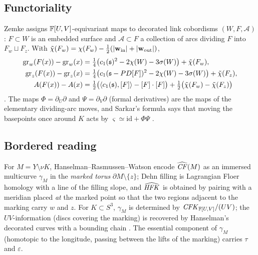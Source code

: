 \subsection{Functoriality}
Zemke \cite{Zemke-link} assigns $\mathbb{F}[U,V]$-equivariant maps to decorated link cobordisms $(W,F,\mathcal A)$:
$F\subset W$ is an embedded surface and $\mathcal A\subset F$ a collection of arcs dividing $F$ into
$F_w\sqcup F_z$.  With $\tilde\chi(F_w)=\chi(F_w)-\frac12(|\mathbf w_{\rm in}|+|\mathbf w_{\rm out}|)$,
\begin{align*}
\mathrm{gr}_w(F(x))-\mathrm{gr}_w(x)&=\tfrac14\big(c_1(\mathfrak s)^2-2\chi(W)-3\sigma(W)\big)+\tilde\chi(F_w),\\
\mathrm{gr}_z(F(x))-\mathrm{gr}_z(x)&=\tfrac14\big(c_1(\mathfrak s-PD[F])^2-2\chi(W)-3\sigma(W)\big)+\tilde\chi(F_z),\\
A(F(x))-A(x)&=\tfrac12\big(\langle c_1(\mathfrak s),[F]\rangle-[F]\cdot[F]\big)+\tfrac12\big(\tilde\chi(F_w)-\tilde\chi(F_z)\big)
\end{align*}
\cite{Zemke-grading}.  The maps $\Phi=\partial_U\partial$ and $\Psi=\partial_V\partial$ (formal derivatives)
are the maps of the elementary dividing-arc moves, and Sarkar's formula says that moving the basepoints
once around $K$ acts by $\varsigma\simeq\mathrm{id}+\Phi\Psi$ \cite{Sarkar}.

\subsection{Bordered reading}
For $M=Y\setminus\nu K$, Hanselman--Rasmussen--Watson \cite{HRW} encode $\widehat{\mathit{CF}}(M)$ as an immersed
multicurve $\gamma_M$ in the \emph{marked torus} $\partial M\setminus\{z\}$; Dehn filling is Lagrangian
Floer homology with a line of the filling slope, and $\widehat{\mathit{HFK}}$ is obtained by pairing with a
meridian placed \emph{at} the marked point so that the two regions adjacent to the marking carry $w$ and
$z$.  For $K\subset S^3$, $\gamma_M$ is determined by $\mathit{CFK}_{\mathbb{F}[U,V]}/(UV)$; the $UV$-information
(discs covering the marking) is recovered by Hanselman's decorated curves with a bounding chain
\cite{Hanselman}.  The essential component of $\gamma_M$ (homotopic to the longitude, passing between
the lifts of the marking) carries $\tau$ and $\varepsilon$.
